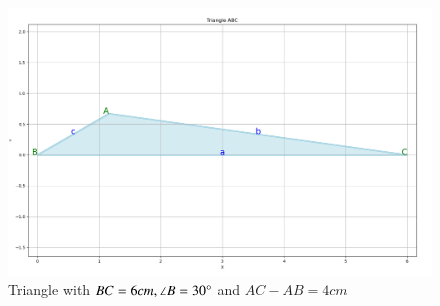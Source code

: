 \documentclass[journal]{IEEEtran}
\begin{document}
\begin{figure}[h!]
   \centering
   \includegraphics[width=0.7\linewidth]{figs/fig.png}
   \caption{Triangle with $BC = 6cm, \angle B =30\degree$ and $AC - AB=4cm$}
\end{figure}
\end{document}
